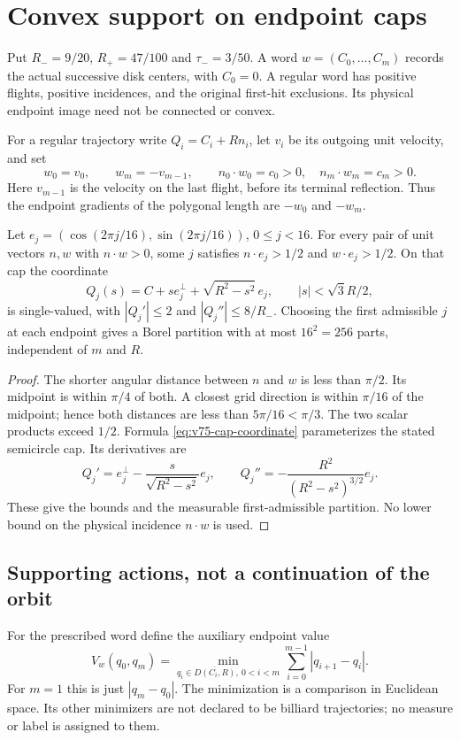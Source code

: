 \section{Convex support on endpoint caps}
\label{sec:v75-convex-support}
Put $R_-=9/20$, $R_+=47/100$ and $\tau_-=3/50$.
A word $w=(C_0,\ldots,C_m)$ records the actual successive disk
centers, with $C_0=0$. A regular word has positive flights, positive
incidences, and the original first-hit exclusions. Its physical
endpoint image need not be connected or convex.

For a regular trajectory write $Q_i=C_i+Rn_i$, let $v_i$ be its
outgoing unit velocity, and set
\[
 w_0=v_0,\qquad w_m=-v_{m-1},\qquad
 n_0\cdot w_0=c_0>0,\quad n_m\cdot w_m=c_m>0.
\]
Here $v_{m-1}$ is the velocity on the last flight, before its terminal
reflection. Thus the endpoint gradients of the polygonal length are
$-w_0$ and $-w_m$.

\begin{lemma}
\label{lem:v75-cap-cover}
Let $e_j=(\cos(2\pi j/16),\sin(2\pi j/16))$, $0\le j<16$.
For every pair of unit vectors $n,w$ with $n\cdot w>0$, some $j$
satisfies $n\cdot e_j>1/2$ and $w\cdot e_j>1/2$.
On that cap the coordinate
\begin{equation}\label{eq:v75-cap-coordinate}
 Q_j(s)=C+s e_j^\perp+\sqrt{R^2-s^2}\,e_j,
 \qquad |s|<\sqrt3 R/2,
\end{equation}
is single-valued, with $|Q_j'|\le2$ and $|Q_j''|\le8/R_-$.
Choosing the first admissible $j$ at each endpoint gives a Borel
partition with at most $16^2=256$ parts, independent of $m$ and $R$.
\end{lemma}
\begin{proof}
The shorter angular distance between $n$ and $w$ is less than
$\pi/2$. Its midpoint is within $\pi/4$ of both. A closest grid
direction is within $\pi/16$ of the midpoint; hence both distances
are less than $5\pi/16<\pi/3$. The two scalar products exceed $1/2$.
Formula \eqref{eq:v75-cap-coordinate} parameterizes the stated
semicircle cap. Its derivatives are
\[
 Q_j'=e_j^\perp-\frac{s}{\sqrt{R^2-s^2}}e_j,
 \qquad Q_j''=-\frac{R^2}{(R^2-s^2)^{3/2}}e_j.
\]
These give the bounds and the measurable first-admissible partition.
No lower bound on the physical incidence $n\cdot w$ is used.
\end{proof}

\subsection{Supporting actions, not a continuation of the orbit}
For the prescribed word define the auxiliary endpoint value
\begin{equation}\label{eq:v75-convex-value}
 V_w(q_0,q_m)=\min_{q_i\in\overline{D(C_i,R)},\ 0<i<m}
                         \sum_{i=0}^{m-1}|q_{i+1}-q_i|.
\end{equation}
For $m=1$ this is just $|q_m-q_0|$. The minimization is a comparison
in Euclidean space. Its other minimizers are not declared to be
billiard trajectories; no measure or label is assigned to them.

